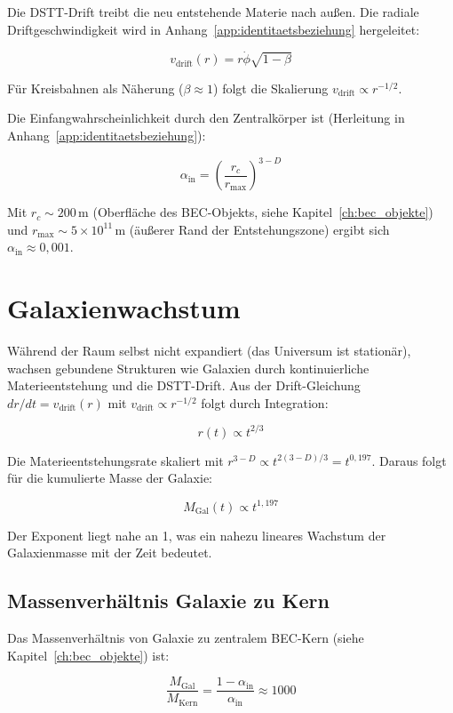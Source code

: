 Die DSTT-Drift treibt die neu entstehende Materie nach außen. Die radiale Driftgeschwindigkeit wird in Anhang~\ref{app:identitaetsbeziehung} hergeleitet:

\[
v_{\text{drift}}(r) = r\dot{\phi} \sqrt{1-\beta}
\]

Für Kreisbahnen als Näherung (\(\beta \approx 1\)) folgt die Skalierung \( v_{\text{drift}} \propto r^{-1/2} \).

Die Einfangwahrscheinlichkeit durch den Zentralkörper ist (Herleitung in Anhang~\ref{app:identitaetsbeziehung}):

\[
\alpha_{\text{in}} = \left( \frac{r_c}{r_{\text{max}}} \right)^{3-D}
\]

Mit \( r_c \sim 200 \, \text{m} \) (Oberfläche des BEC-Objekts, siehe Kapitel~\ref{ch:bec_objekte}) und \( r_{\text{max}} \sim 5 \times 10^{11} \, \text{m} \) (äußerer Rand der Entstehungszone) ergibt sich \( \alpha_{\text{in}} \approx 0,001 \).

\section{Galaxienwachstum}
\label{sec:kosmo_galaxienwachstum}

Während der Raum selbst nicht expandiert (das Universum ist stationär), wachsen gebundene Strukturen wie Galaxien durch kontinuierliche Materieentstehung und die DSTT-Drift. Aus der Drift-Gleichung \( dr/dt = v_{\text{drift}}(r) \) mit \( v_{\text{drift}} \propto r^{-1/2} \) folgt durch Integration:

\[
r(t) \propto t^{2/3}
\]

Die Materieentstehungsrate skaliert mit \( r^{3-D} \propto t^{2(3-D)/3} = t^{0,197} \). Daraus folgt für die kumulierte Masse der Galaxie:

\[
M_{\text{Gal}}(t) \propto t^{1,197}
\]

Der Exponent liegt nahe an 1, was ein nahezu lineares Wachstum der Galaxienmasse mit der Zeit bedeutet.

\subsection{Massenverhältnis Galaxie zu Kern}
\label{sub:kosmo_massenverhaeltnis}

Das Massenverhältnis von Galaxie zu zentralem BEC-Kern (siehe Kapitel~\ref{ch:bec_objekte}) ist:

\[
\frac{M_{\text{Gal}}}{M_{\text{Kern}}} = \frac{1 - \alpha_{\text{in}}}{\alpha_{\text{in}}} \approx 1000
\]

